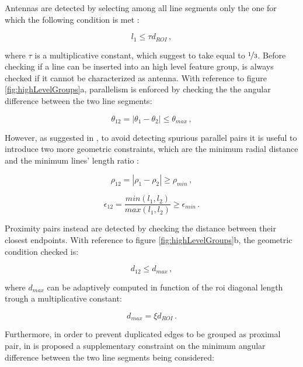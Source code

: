 Antennas are detected by selecting among all line segments only the one for which the following condition is met :

\begin{equation}
  l_1  \leqslant \tau d_{ROI} \,,
\end{equation}

where $\tau$ is a multiplicative constant, which \cite{Sharma2018} suggest to take equal to $\nicefrac{1}{3}$. Before checking if a line can be inserted into an high level feature group, is always checked if it cannot be characterized as antenna.
With reference to figure \ref{fig:highLevelGroups}a, parallelism is enforced by checking the the angular difference between the two line segments:

\begin{equation}
  \theta_{12} = |\theta_1 - \theta_2| \leqslant \theta_{max} \,,
\end{equation}

However, as suggested in \cite{fracchio2019}, to avoid detecting spurious parallel pairs it is useful to introduce two more geometric constraints, which are the minimum radial distance and the minimum lines' length ratio :

\begin{equation}
  \rho_{12} = |\rho_1 - \rho_2| \geq  \rho_{min} \,,
\end{equation}

\begin{equation}
  \epsilon_{12} = \frac{min(l_1,l_2)}{max(l_1,l_2)} \geq \epsilon_{min} \,.
\end{equation}

Proximity pairs instead are detected by checking the distance between their closest endpoints. With reference to figure  \ref{fig:highLevelGroups}b, the geometric condition checked is:

\begin{equation}
  d_{12} \leqslant d_{max} \,,
\end{equation}

where $d_{max}$ can be adaptively computed in function of the \acrshort{roi} diagonal length trough a multiplicative constant:

\begin{equation}
  d_{max} = \xi d_{ROI} \,.
\end{equation}

Furthermore, in order to prevent duplicated edges to be grouped as proximal pair, in \cite{fracchio2019} is proposed a supplementary constraint on the minimum angular difference between the two line segments being considered:

